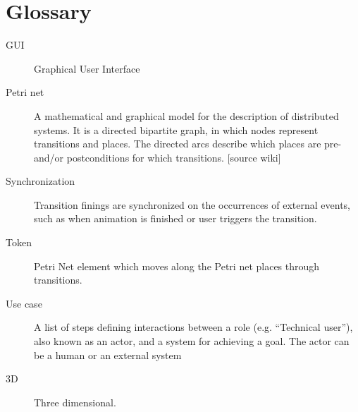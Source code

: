 \section{Glossary}
\begin{description}

\item [GUI] Graphical User Interface

\item [Petri net] A mathematical and graphical model for the description of distributed systems. It is a directed bipartite graph, in which nodes represent transitions and places. The directed arcs describe which places are pre- and/or postconditions for which transitions. [source wiki]

\item [Synchronization] Transition finings are synchronized on the occurrences of external events, such as when animation is finished or user triggers the transition.

\item [Token] Petri Net element which moves along the Petri net places through transitions.

\item [Use case] A list of steps defining interactions between a role (e.g. “Technical user”), also known as an actor, and a system for achieving a goal. The actor can be a human or an external system

\item [3D] Three dimensional.


 \end{description}

